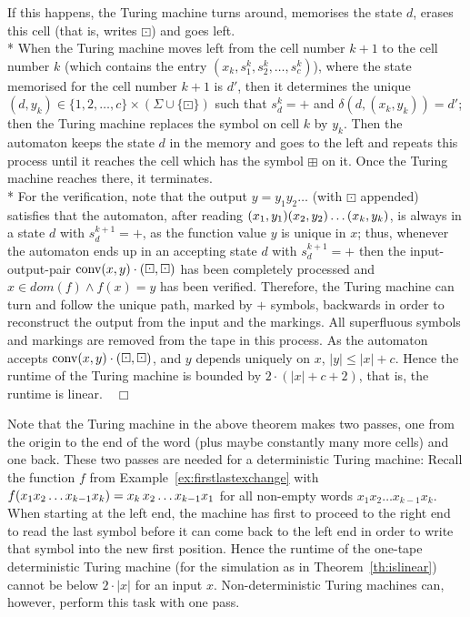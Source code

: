 \documentclass{LMCS}
\theoremstyle{plain}\newtheorem{athm}[thm]{Theorem}
\theoremstyle{plain}\newtheorem{aprop}[thm]{Proposition}
\theoremstyle{plain}\newtheorem{aprob}[thm]{Open Problem}
\theoremstyle{plain}\newtheorem{acor}[thm]{Corollary}
\theoremstyle{plain}\newtheorem{alem}[thm]{Lemma}
\theoremstyle{definition}\newtheorem{adefn}[thm]{Definition}
\theoremstyle{definition}\newtheorem{arem}[thm]{Remark}
\theoremstyle{plain}\newtheorem{aexmp}[thm]{Example}
\theoremstyle{plain}\newtheorem{aclm}[thm]{Claim}
\def\niceqed{~~$\Box$}
\def\conv{{\rm{conv}}}
\def\sp{\\*\indent}
\begin{document}
If this happens, the Turing machine turns around, memorises
the state $d$, erases this cell (that is, writes $\boxdot$)
and goes left. 
\sp
When the Turing machine moves left from the cell number $k+1$ to the cell 
number $k$ (which contains the entry $(x_k,s^k_1,s^k_2,\ldots,s^k_c)$),
where the state memorised for the cell number $k+1$ is $d'$, 
then it determines the
unique $(d,y_k) \in \{1,2,\ldots,c\} \times
 (\Sigma \cup \{\boxdot\})$ such that $s^k_d = +$ and
$\delta(d,(x_k,y_k))=d'$;
then the Turing machine 
replaces the symbol on cell $k$ by $y_k$.
Then the automaton keeps the state $d$ in the memory and goes to
the left and repeats this
process until it reaches the cell which has the symbol
$\boxplus$ on it. Once the Turing machine reaches there, it
terminates.
\sp
For the verification, note that the output $y=y_1y_2\ldots$ 
(with $\boxdot$ appended) satisfies
that the automaton, after reading $(x_1,y_1) \linebreak[3] (x_2,y_2)
\linebreak[3] \ldots \linebreak[3] (x_k,y_k)$, is always in a state $d$
with $s^{k+1}_d = +$,
as the function value $y$ is unique in $x$;
thus, whenever the automaton ends up in an accepting state $d$ with
$s^{k+1}_d = +$ then the input-output-pair
$\conv(x,y) \cdot (\boxdot,\boxdot)$ has
been completely processed and $x \in dom(f) \wedge f(x)=y$ has been
verified. Therefore, the Turing machine can turn and follow the
unique path, marked by $+$ symbols, backwards in order to reconstruct
the output from the input and the markings. All superfluous symbols
and markings are removed from the tape in this process. 
As the automaton accepts $\conv(x,y) \cdot (\boxdot,\boxdot)$,
and $y$ depends uniquely on $x$, $|y| \leq |x|+c$. 
Hence the runtime
of the Turing machine is bounded by $2 \cdot (|x|+c+2)$, that is, the
runtime is linear.\niceqed

\begin{rem}
Note that the Turing machine in the above theorem 
makes two passes, one from the origin to
the end of the word (plus maybe constantly many more cells)
and one back. These two passes are needed
for a deterministic Turing machine: Recall
the function $f$ from Example~\ref{ex:firstlastexchange} with
$f(x_1 x_2 \ldots \linebreak[3] x_{k-1} x_k) = x_k \, x_2 \ldots x_{k-1} x_1$
for all non-empty words $x_1 x_2 \ldots x_{k-1} x_k$. When starting at the left
end, the machine has first to proceed to the right end to read the last
symbol before it can come back to the left end in order to write that
symbol into the new first position. Hence the runtime of the one-tape
deterministic Turing machine (for the simulation as in
Theorem~\ref{th:islinear})
cannot be below $2 \cdot |x|$ for an input $x$. Non-deterministic Turing
machines can, however, perform this task with one pass.
\end{rem}
\end{document}
